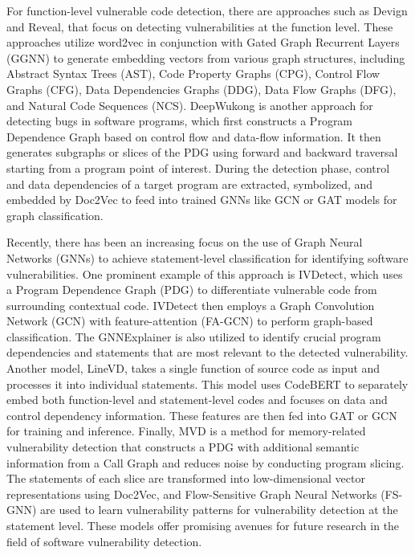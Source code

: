 \documentclass{ieeeaccess}
\begin{document}
\par For function-level vulnerable code detection, there are approaches such as Devign\cite{devign} and Reveal\cite{Are}, that focus on detecting vulnerabilities at the function level. These approaches utilize word2vec in conjunction with Gated Graph Recurrent Layers (GGNN) \cite{GGNN} to generate embedding vectors from various graph structures, including Abstract Syntax Trees (AST), Code Property Graphs (CPG), Control Flow Graphs (CFG), Data Dependencies Graphs (DDG), Data Flow Graphs (DFG), and Natural Code Sequences (NCS).  DeepWukong \cite{DeepWukong} is another approach for detecting bugs in software programs, which first constructs a Program Dependence Graph based on control flow and data-flow information. It then generates subgraphs or slices of the PDG using forward and backward traversal starting from a program point of interest. During the detection phase, control and data dependencies of a target program are extracted, symbolized, and embedded by Doc2Vec\cite{doc2vec} to feed into trained GNNs like GCN\cite{GCN} or GAT\cite{GAT} models for graph classification.

\par Recently, there has been an increasing focus on the use of Graph Neural Networks (GNNs) to achieve statement-level classification for identifying software vulnerabilities. One prominent example of this approach is IVDetect\cite{IVDetect}, which uses a Program Dependence Graph (PDG) to differentiate vulnerable code from surrounding contextual code. IVDetect then employs a Graph Convolution Network (GCN)\cite{GCN} with feature-attention (FA-GCN) to perform graph-based classification. The GNNExplainer\cite{GNExplainer} is also utilized to identify crucial program dependencies and statements that are most relevant to the detected vulnerability. Another model, LineVD\cite{Linevd}, takes a single function of source code as input and processes it into individual statements. This model uses CodeBERT \cite{codebert}to separately embed both function-level and statement-level codes and focuses on data and control dependency information. These features are then fed into GAT or GCN for training and inference. Finally, MVD\cite{MVD} is a method for memory-related vulnerability detection that constructs a PDG with additional semantic information from a Call Graph and reduces noise by conducting program slicing. The statements of each slice are transformed into low-dimensional vector representations using Doc2Vec, and Flow-Sensitive Graph Neural Networks (FS-GNN) are used to learn vulnerability patterns for vulnerability detection at the statement level. These models offer promising avenues for future research in the field of software vulnerability detection.
\end{document}
